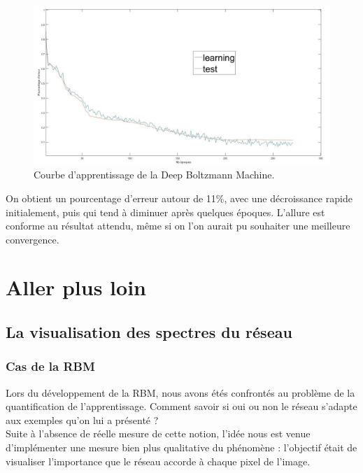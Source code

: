 \documentclass[a4paper,oneside]{report}
\begin{document}
                \begin{figure}
                    \begin{center}
                        \includegraphics[width=450px]{Images/courbeDBM.jpg}
                    \end{center}
                    \caption{Courbe d'apprentissage de la Deep Boltzmann Machine.}
                \end{figure}

On obtient un pourcentage d'erreur autour de 11\%, avec une décroissance rapide initialement, puis qui tend à diminuer après quelques époques. L'allure est conforme au résultat attendu, même si on l'on aurait pu souhaiter une meilleure convergence.



        \chapter{Aller plus loin}

            \section{La visualisation des spectres du réseau}

\subsection{Cas de la RBM}

                Lors du développement de la RBM, nous avons étés confrontés au problème de la 
quantification de l'apprentissage. Comment savoir si oui ou non le réseau s'adapte aux 
exemples qu'on lui a présenté ?\\

                Suite à l'absence de réelle mesure de cette notion, l'idée nous est venue 
d'implémenter une mesure bien plus qualitative du phénomène : l'objectif était de 
visualiser l'importance que le réseau 
accorde à chaque pixel de l'image.\\
\end{document}

